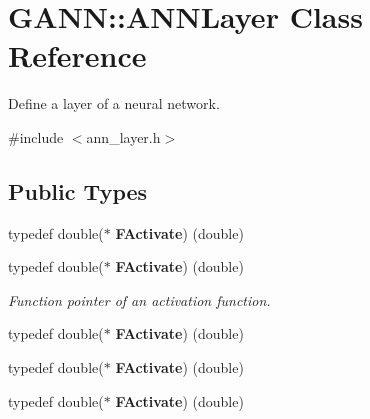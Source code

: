 \section{G\+A\+N\+N\+:\+:A\+N\+N\+Layer Class Reference}
\label{class_g_a_n_n_1_1_a_n_n_layer}


Define a layer of a neural network.  




{\ttfamily \#include $<$ann\+\_\+layer.\+h$>$}

\subsection*{Public Types}
\begin{DoxyCompactItemize}
\item 
typedef double($\ast$ {\bfseries F\+Activate}) (double)\label{class_g_a_n_n_1_1_a_n_n_layer_abb160533dd36e791bd0e561ef244cbae}

\item 
typedef double($\ast$ {\bf F\+Activate}) (double)\label{class_g_a_n_n_1_1_a_n_n_layer_abb160533dd36e791bd0e561ef244cbae}

\begin{DoxyCompactList}\small\item\em Function pointer of an activation function. \end{DoxyCompactList}\item 
typedef double($\ast$ {\bfseries F\+Activate}) (double)\label{class_g_a_n_n_1_1_a_n_n_layer_abb160533dd36e791bd0e561ef244cbae}

\item 
typedef double($\ast$ {\bfseries F\+Activate}) (double)\label{class_g_a_n_n_1_1_a_n_n_layer_abb160533dd36e791bd0e561ef244cbae}

\item 
typedef double($\ast$ {\bfseries F\+Activate}) (double)\label{class_g_a_n_n_1_1_a_n_n_layer_abb160533dd36e791bd0e561ef244cbae}

\end{DoxyCompactItemize}

